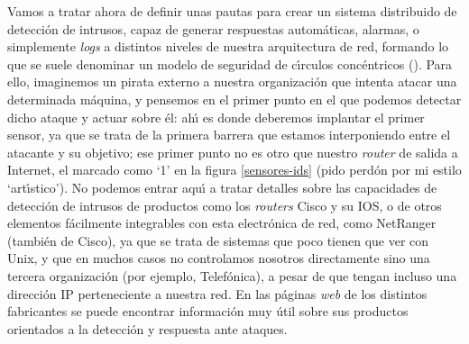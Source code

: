 Vamos a tratar ahora de definir unas pautas para crear un sistema distribuido
de detecci\'on de intrusos, capaz de generar respuestas autom\'aticas, alarmas, 
o simplemente {\it logs} a distintos niveles de nuestra arquitectura de red, 
formando lo que se suele denominar un modelo de seguridad de c\'{\i}rculos
conc\'entricos (\cite{kn:isv95}). Para ello, imaginemos un pirata externo a 
nuestra organizaci\'on que intenta atacar una determinada m\'aquina, y 
pensemos en el primer punto en el que podemos detectar dicho ataque y actuar 
sobre \'el: ah\'{\i} es donde deberemos implantar el primer sensor, ya que se
trata de la primera barrera que estamos interponiendo entre el atacante y su
objetivo; ese primer punto no es otro que nuestro {\it router} de salida a
Internet, el marcado como `1' en la figura \ref{sensores-ids} (pido perd\'on 
por mi estilo `art\'{\i}stico'). No podemos 
entrar aqu\'{\i} a tratar detalles sobre las capacidades 
de detecci\'on de intrusos de productos como los {\it routers} Cisco y su IOS, 
o de otros elementos f\'acilmente integrables con esta electr\'onica de red, 
como NetRanger (tambi\'en de Cisco), ya que se trata de sistemas que poco tienen
que ver con Unix, y que en muchos casos no controlamos nosotros directamente
sino una tercera organizaci\'on (por ejemplo, Telef\'onica), a pesar de que
tengan incluso una direcci\'on IP perteneciente a nuestra red. En las p\'aginas
{\it web} de los distintos fabricantes se puede encontrar informaci\'on muy
\'util sobre sus productos orientados a la detecci\'on y respuesta ante 
ataques.
